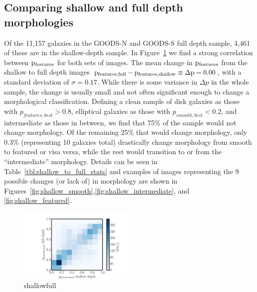 \documentclass[usenatbib]{mn2e}
\begin{document}
\subsection{Comparing shallow and full depth morphologies}

Of the 11,157 galaxies in the GOODS-N and GOODS-S full depth sample, 4,461 of these are in the shallow-depth sample. In Figure~\ref{fig:shallow_vs_full} we find a strong correlation between $\rm p_{features}$ for both sets of images. The mean change in $\rm p_{features}$ from the shallow to full depth images  $\rm p_{features,full} - p_{features,shallow} \equiv \Delta p = 0.00$, with a standard deviation of $\sigma = 0.17$. While there is some variance in $\Delta p$ in the whole sample, the change is usually small and not often significant enough to change a morphological classification. Defining a clean sample of disk galaxies as those with $p_{features,best}>0.8$, elliptical galaxies as those with  $p_{smooth,best}<0.2$, and intermediate as those in between, we find that 75\% of the sample would not change morphology. Of the remaining 25\% that would change morphology, only 0.3\% (representing 10 galaxies total) drastically change morphology from smooth to featured or visa versa, while the rest would transition to or from the ``intermediate'' morphology. Details can be seen in Table~\ref{tbl:shallow_to_full_stats} and examples of images representing the 9 possible changes (or lack of) in morphology are shown in Figures~\ref{fig:shallow_smooth},\ref{fig:shallow_intermediate}, and \ref{fig:shallow_featured}.

\begin{figure}
\begin{center}
\includegraphics[width=0.50\textwidth]{figures/full_shallow_p_plot.pdf}
\caption{shallowfull}
\label{fig:shallow_vs_full}
\end{center}
\end{figure}
\end{document}
